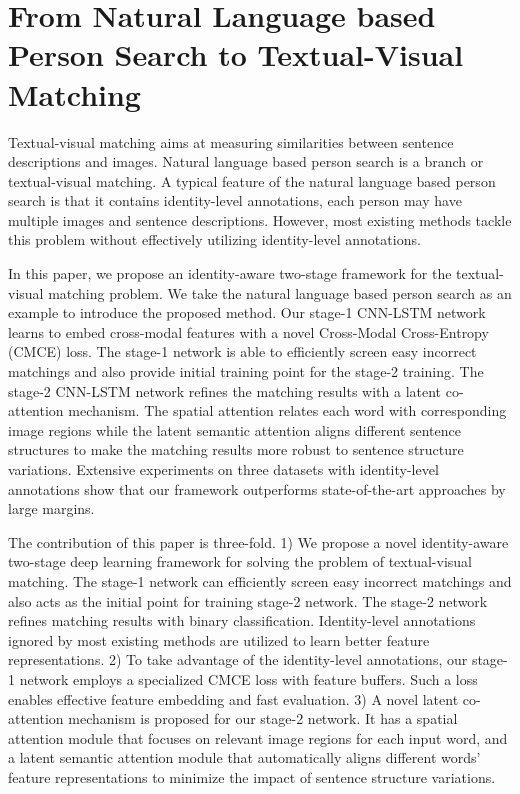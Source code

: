 \chapter{From Natural Language based Person Search to Textual-Visual Matching}

Textual-visual matching aims at measuring similarities between sentence descriptions and images. Natural language based person search is a branch or textual-visual matching. A typical feature of the natural language based person search is that it contains identity-level annotations, \ie each person may have multiple images and sentence descriptions. However, most existing methods tackle this problem without effectively utilizing identity-level annotations.

In this paper, we propose an identity-aware two-stage framework for the textual-visual matching problem. We take the natural language based person search as an example to introduce the proposed method. Our stage-1 CNN-LSTM network learns to embed cross-modal features with a novel Cross-Modal Cross-Entropy (CMCE) loss.  The stage-1 network is able to efficiently screen easy incorrect matchings and also provide initial training point for the stage-2 training.
The stage-2 CNN-LSTM network refines the matching results with a latent co-attention mechanism.
The spatial attention relates each word with corresponding image regions while the latent semantic attention aligns different sentence structures to make the matching results more robust to sentence structure variations.
Extensive experiments on three datasets with identity-level annotations show that our framework outperforms state-of-the-art approaches by large margins.

The contribution of this paper is three-fold. 1) We propose a novel identity-aware two-stage deep learning framework for solving the problem of textual-visual matching. The stage-1 network can efficiently screen easy incorrect matchings and also acts as the initial point for training stage-2 network. The stage-2 network refines matching results with binary classification. Identity-level annotations ignored by most existing methods are utilized to learn better feature representations. 2) To take advantage of the identity-level annotations, our stage-1 network employs a specialized CMCE loss with feature buffers. Such a loss enables effective feature embedding and fast evaluation. 3) A novel latent co-attention mechanism is proposed for our stage-2 network. It has a spatial attention module that focuses on relevant image regions for each input word, and a latent semantic attention module that automatically aligns different words' feature representations to minimize the impact of sentence structure variations.

